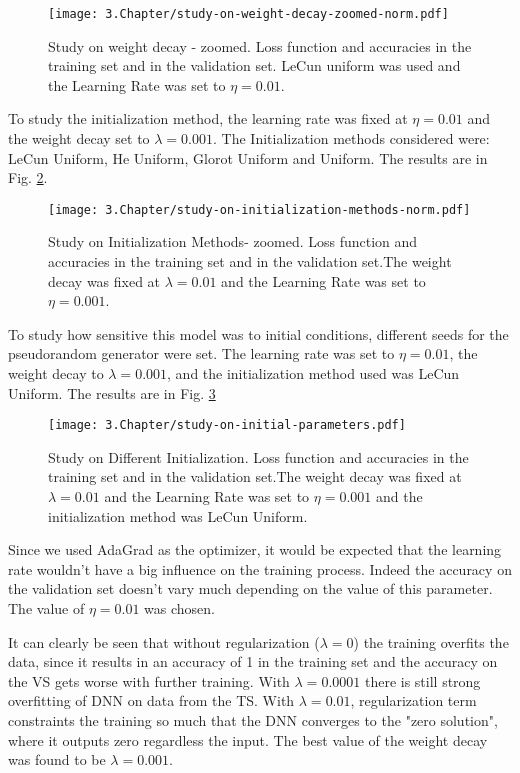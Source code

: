 \begin{figure}[htb]
	\centering
	\texttt{[image: 3.Chapter/study-on-weight-decay-zoomed-norm.pdf]}
	\caption{Study on weight decay - zoomed. Loss function and accuracies in the training set and in the validation set. LeCun uniform was used and the Learning Rate was set to $\eta = 0.01$.
}
\label{fig:study-weightdecays-zoomed}
\end{figure}


To study the initialization method, the learning rate was fixed at $\eta = 0.01$ and the weight decay set to $\lambda = 0.001$. The Initialization methods considered were: LeCun Uniform, He Uniform, Glorot Uniform and Uniform. The results are in Fig. \ref{fig:study-InitMethods}.
\begin{figure}[htb]
	\centering
	\texttt{[image: 3.Chapter/study-on-initialization-methods-norm.pdf]}
	\caption{Study on Initialization Methods- zoomed. Loss function and accuracies in the training set and in the validation set.The weight decay was fixed at $\lambda = 0.01$ and the Learning Rate was set to $\eta = 0.001$.
}
\label{fig:study-InitMethods}
\end{figure}

To study how sensitive this model was to initial conditions, different seeds for the pseudorandom generator were set. The learning rate was set to $\eta = 0.01$, the weight decay to $\lambda = 0.001$, and the initialization method used was LeCun Uniform. The results are in Fig. \ref{fig:study-seeds}

\begin{figure}[htb]
	\centering
	\texttt{[image: 3.Chapter/study-on-initial-parameters.pdf]}
	\caption{Study on Different Initialization. Loss function and accuracies in the training set and in the validation set.The weight decay was fixed at $\lambda = 0.01$ and the Learning Rate was set to $\eta = 0.001$ and the initialization method was LeCun Uniform.
}
\label{fig:study-seeds}
\end{figure}

Since we used AdaGrad as the optimizer, it would be expected that the learning rate wouldn't have a big influence on the training process. Indeed the accuracy on the validation set doesn't vary much depending on the value of this parameter. The value of $\eta = 0.01$ was chosen.

It can clearly be seen that without regularization ($\lambda = 0$) the training overfits the data, since it results in an accuracy of 1 in the training set and the accuracy on the VS gets worse with further training. With $\lambda = 0.0001$ there is still strong overfitting of DNN on data from the TS. With $\lambda = 0.01$, regularization term constraints the training so much that the DNN converges to the "zero solution", where it outputs zero regardless the input. The best value of the weight decay was found to be $\lambda = 0.001$.

